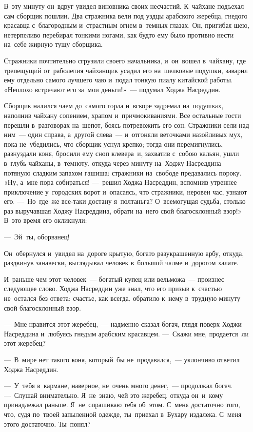 \documentclass[12pt,a4paper]{book}
\begin{document}
В~эту минуту он~вдруг увидел виновника своих несчастий. К~чайхане подъехал сам сборщик пошлин. Два стражника вели под уздцы арабского жеребца, гнедого красавца с~благородным и~страстным огнем в~темных глазах. Он, пригибая шею, нетерпеливо перебирал тонкими ногами, как будто ему было противно нести на~себе жирную тушу сборщика.

Стражники почтительно сгрузили своего начальника, и~он~вошел в~чайхану, где трепещущий от~раболепия чайханщик усадил его на~шелковые подушки, заварил ему отдельно самого лучшего чаю и~подал тонкую пиалу китайской работы. «Неплохо встречают его за~мои деньги!»~— подумал Ходжа Насреддин.

Сборщик налился чаем до~самого горла и~вскоре задремал на~подушках, наполнив чайхану сопением, храпом и~причмокиваниями. Все остальные гости перешли в~разговорах на~шепот, боясь потревожить его сон. Стражники сели над ним~— один справа, а~другой слева~— и~отгоняли веточками назойливых мух, пока не~убедились, что сборщик уснул крепко; тогда они перемигнулись, разнуздали коня, бросили ему сноп клевера~и, захватив с~собою кальян, ушли в~глубь чайханы, в~темноту, откуда через минуту на~Ходжу Насреддина потянуло сладким запахом гашиша: стражники на~свободе предавались пороку. «Ну, а~мне пора собираться! —~решил Ходжа Насреддин, вспомнив утреннее приключение у~городских ворот и~опасаясь, что стражники, неровен час, узнают его. —~Но~где~же все-таки достану я~полтаньга? О~всемогущая судьба, столько раз выручавшая Ходжу Насреддина, обрати на~него свой благосклонный взор!» В~это время его окликнули:

—~Эй~ты, оборванец!

Он~обернулся и~увидел на~дороге крытую, богато разукрашенную арбу, откуда, раздвинув занавески, выглядывал человек в~большой чалме и~дорогом халате.

И~раньше чем этот человек~— богатый купец или вельможа~— произнес следующее слово. Ходжа Насреддин уже знал, что его призыв к~счастью не~остался без ответа: счастье, как всегда, обратило к~нему в~трудную минуту свой благосклонный взор.

—~Мне нравится этот жеребец,~— надменно сказал богач, глядя поверх Ходжи Насреддина и~любуясь гнедым арабским красавцем. —~Скажи мне, продается~ли этот жеребец?

—~В~мире нет такого коня, который~бы не~продавался,~— уклончиво ответил Ходжа Насреддин.

—~У~тебя в~кармане, наверное, не~очень много денег,~— продолжал богач. —~Слушай внимательно. Я~не~знаю, чей это жеребец, откуда он~и~кому принадлежал раньше. Я~не~спрашиваю тебя об~этом. С~меня достаточно того, что, судя по~твоей запыленной одежде, ты~приехал в~Бухару издалека. С~меня этого достаточно. Ты~понял?
\end{document}
